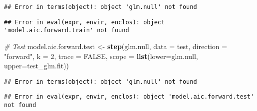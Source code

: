 \documentclass[]{article}
\newenvironment{Shaded}{\begin{snugshade}}{\end{snugshade}}
\newcommand{\CommentTok}[1]{\textcolor[rgb]{0.56,0.35,0.01}{\textit{#1}}}
\newcommand{\DataTypeTok}[1]{\textcolor[rgb]{0.13,0.29,0.53}{#1}}
\newcommand{\DecValTok}[1]{\textcolor[rgb]{0.00,0.00,0.81}{#1}}
\newcommand{\KeywordTok}[1]{\textcolor[rgb]{0.13,0.29,0.53}{\textbf{#1}}}
\newcommand{\NormalTok}[1]{#1}
\newcommand{\OperatorTok}[1]{\textcolor[rgb]{0.81,0.36,0.00}{\textbf{#1}}}
\newcommand{\OtherTok}[1]{\textcolor[rgb]{0.56,0.35,0.01}{#1}}
\newcommand{\StringTok}[1]{\textcolor[rgb]{0.31,0.60,0.02}{#1}}
\begin{document}
\begin{verbatim}
## Error in terms(object): object 'glm.null' not found
\end{verbatim}

\begin{Shaded}
\end{Shaded}

\begin{verbatim}
## Error in eval(expr, envir, enclos): object 'model.aic.forward.train' not found
\end{verbatim}

\begin{Shaded}
\begin{Highlighting}[]
\CommentTok{# Test}
\NormalTok{model.aic.forward.test <-}\StringTok{ }\KeywordTok{step}\NormalTok{(glm.null, }\DataTypeTok{data =}\NormalTok{ test, }\DataTypeTok{direction =} \StringTok{"forward"}\NormalTok{, }\DataTypeTok{k =} \DecValTok{2}\NormalTok{, }\DataTypeTok{trace =} \OtherTok{FALSE}\NormalTok{,}
                          \DataTypeTok{scope =} \KeywordTok{list}\NormalTok{(}\DataTypeTok{lower=}\NormalTok{glm.null, }\DataTypeTok{upper=}\NormalTok{test_glm.fit))}
\end{Highlighting}
\end{Shaded}

\begin{verbatim}
## Error in terms(object): object 'glm.null' not found
\end{verbatim}

\begin{Shaded}
\end{Shaded}

\begin{verbatim}
## Error in eval(expr, envir, enclos): object 'model.aic.forward.test' not found
\end{verbatim}
\end{document}
